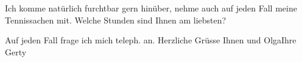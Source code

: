 \pstart
           Ich komme natürlich furchtbar gern hinüber, nehme auch auf jeden Fall meine
               Tennissachen mit. Welche Stunden sind Ihnen am liebsten?\pend
           
\pstart
           Auf jeden Fall frage ich mich teleph. an.\pend
           \pstart Herzliche Grüsse Ihnen und Olga\hspace*{1.5em}Ihre \spacefill\mbox{Gerty}\pend{}\endnumbering{}  \newcommand{\dateiname}{L01680}\newcommand{\titel}{Gerty von Hofmannsthal an Arthur Schnitzler, [29. 5. 1907]}\newcommand{\editorInnen}{Martin Anton Müller und Gerd-Hermann Susen}
